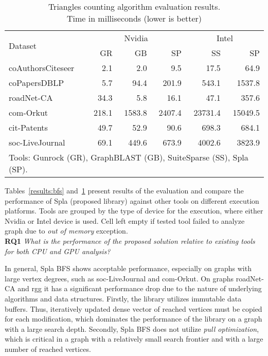 \begin{table}[h]
\caption{Triangles counting algorithm evaluation results.\\Time in milliseconds (lower is better)} 
\begin{center}
    \begin{tabular}{|l|r|r|r|r|r|}
    \hline
    \multirow{2}{*}{Dataset} & \multicolumn{3}{c|}{Nvidia} & \multicolumn{2}{c|}{Intel} \\
    \cline{2-6}
    & GR & GB & SP & SS & SP \\
    \hline
    \hline
    \rowcolor{black!10} coAuthorsCiteseer &   2.1 &    2.0 &    9.5 &    17.5 &    64.9 \\
    \rowcolor{black!2 } coPapersDBLP      &   5.7 &   94.4 &  201.9 &   543.1 &  1537.8 \\
    \rowcolor{black!10} roadNet-CA        &  34.3 &    5.8 &   16.1 &    47.1 &   357.6 \\
    \rowcolor{black!2 } com-Orkut         & 218.1 & 1583.8 & 2407.4 & 23731.4 & 15049.5 \\
    \rowcolor{black!10} cit-Patents       &  49.7 &   52.9 &   90.6 &   698.3 &   684.1 \\
    \rowcolor{black!2 } soc-LiveJournal   &  69.1 &  449.6 &  673.9 &  4002.6 &  3823.9 \\
    \hline
    \hline
    \multicolumn{6}{l}{Tools: Gunrock (GR), GraphBLAST (GB), SuiteSparse (SS), Spla (SP).} \\
    \end{tabular}
    \label{results:tc}
\end{center}
\end{table}

Tables~\ref{results:bfs} and~\ref{results:tc} present results of the evaluation and compare the performance of Spla (proposed library) against other tools on different execution platforms. Tools are grouped by the type of device for the execution, where either Nvidia or Intel device is used. Cell left empty if tested tool failed to analyze graph due to \textit{out of memory} exception.\\

\textbf{RQ1} \textit{What is the performance of the proposed solution relative to existing tools for both CPU and GPU analysis?}

In general, Spla BFS shows acceptable performance, especially on graphs with large vertex degrees, such as soc-LiveJournal and com-Orkut. On graphs roadNet-CA and rgg it has a significant performance drop due to the nature of underlying algorithms and data structures. Firstly, the library utilizes immutable data buffers. Thus, iteratively updated dense vector of reached vertices must be copied for each modification, which dominates the performance of the library on a graph with a large search depth. Secondly, Spla BFS does not utilize \textit{pull optimization}, which is critical in a graph with a relatively small search frontier and with a large number of reached vertices. 

